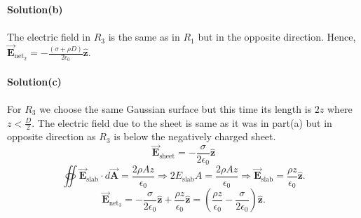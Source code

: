 \documentclass{article}
\begin{document}
\textbf{Solution(b)}
\\
\\The electric field in $R_3$ is the same as in $R_1$ but in the opposite direction. Hence, $\Vec{\boldsymbol{E}}_{\text{net}_2}=-\frac{(\sigma+\rho D)}{2\epsilon_0}\boldsymbol{\hat{z}}.$
\\
\\\textbf{Solution(c)}
\\
\\For $R_3$ we choose the same Gaussian surface but this time its length is $2z$ where $z<\frac{D}{2}$. The electric field due to the sheet is same as it was in part(a) but in opposite direction as $R_3$ is below the negatively charged sheet.
\[\Vec{\boldsymbol{E}}_{\text{sheet}}=-\frac{\sigma}{2\epsilon_0}\boldsymbol{\hat{z}}\]
\[\oiint\Vec{\boldsymbol{E}}_{\text{slab}}\cdot d\Vec{\boldsymbol{A}}=\frac{2\rho Az}{\epsilon_0}\Rightarrow2E_{\text{slab}}A=\frac{2\rho Az}{\epsilon_0}\Rightarrow\Vec{\boldsymbol{E}}_{\text{slab}}=\frac{\rho z}{\epsilon_0}\boldsymbol{\hat{z}}.\]
\[\Vec{\boldsymbol{E}}_{\text{net}_3}=-\frac{\sigma}{2\epsilon_0}\boldsymbol{\hat{z}}+\frac{\rho z}{\epsilon_0}\boldsymbol{\hat{z}}=\left(\frac{\rho z}{\epsilon_0}-\frac{\sigma}{2\epsilon_0}\right)\boldsymbol{\hat{z}}.\]
\end{document}
